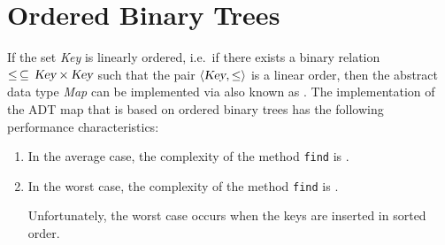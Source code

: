 \section{Ordered Binary Trees}
If the set \textsl{Key} is linearly ordered, i.e.~if there exists a binary relation
$\leq \,\subseteq\,\textsl{Key}\times\textsl{Key}$ such that the pair $\langle \textsl{Key}, \leq \rangle$ is a linear
order, then the abstract data type \textsl{Map} can be implemented via  
\href{https://en.wikipedia.org/wiki/Binary_search_tree}{} also known as
. 
The implementation of the ADT map that is based on ordered binary trees has the following performance
characteristics: 
\begin{enumerate}
\item In the average case, the complexity of the method \texttt{find} is .
\item In the worst case, the complexity of the method \texttt{find} is .

      Unfortunately, the worst case occurs when the keys are inserted in sorted order.
\end{enumerate}

